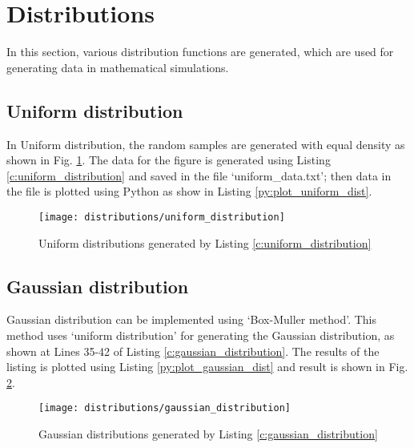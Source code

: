 \section{Distributions}

In this section, various distribution functions are generated, which are used for generating data in mathematical simulations. 

\subsection{Uniform distribution}
In Uniform distribution, the random samples are generated with equal density as shown in Fig. \ref{fig:uniform_distribution}. The data for the figure is generated using Listing \ref{c:uniform_distribution} and saved in the file `uniform\_data.txt'; then data in the file is plotted using Python as show in Listing \ref{py:plot_uniform_dist}. 





\begin{figure}[!h]
	\centering
	\texttt{[image: distributions/uniform\_distribution]}
	\caption{Uniform distributions generated by Listing \ref{c:uniform_distribution}}
	\label{fig:uniform_distribution}
\end{figure}


\subsection{Gaussian distribution}
Gaussian distribution can be implemented using `Box-Muller method'. This method uses `uniform distribution' for generating the Gaussian distribution, as shown at Lines 35-42 of Listing \ref{c:gaussian_distribution}. The results of the listing is plotted using Listing \ref{py:plot_gaussian_dist} and result is shown in Fig. \ref{fig:gaussian_distribution}.
\begin{figure}[!h]
	\centering
	\texttt{[image: distributions/gaussian\_distribution]}
	\caption{Gaussian distributions generated by Listing \ref{c:gaussian_distribution}}
	\label{fig:gaussian_distribution}
\end{figure}






